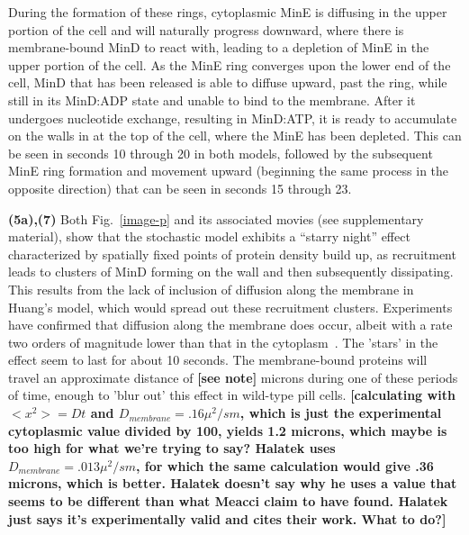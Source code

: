 \documentclass[10pt,letterpaper]{article}
\newcommand{\fixme}[1]{\red{[#1]}}
\newcommand{\red}[1]{{\bf \color{red} #1}}
\newcommand{\blue}[1]{{\bf \color{blue} #1}}
\begin{document}
During the formation of these rings, cytoplasmic MinE is diffusing in
the upper portion of the cell and will naturally progress downward,
where there is membrane-bound MinD to react with, leading to a
depletion of MinE in the upper portion of the cell.  As the MinE ring
converges upon the lower end of the cell, MinD that has been released
is able to diffuse upward, past the ring, while still in its MinD:ADP
state and unable to bind to the membrane.  After it undergoes
nucleotide exchange, resulting in MinD:ATP, it is ready to accumulate
on the walls in at the top of the cell, where the MinE has been
depleted.  This can be seen in seconds 10 through 20 in both models,
followed by the subsequent MinE ring formation and movement upward
(beginning the same process in the opposite direction) that can be
seen in seconds 15 through 23.

\blue{(5a),(7)} Both Fig.~\ref{image-p} and its associated movies (see
supplementary material), show that the stochastic model exhibits a
``starry night'' effect characterized by spatially fixed points of
protein density build up, as recruitment leads to clusters of MinD
forming on the wall and then subsequently dissipating.  This results
from the lack of inclusion of diffusion along the membrane in Huang's
model, which would spread out these recruitment clusters.  Experiments
have confirmed that diffusion along the membrane does occur, albeit
with a rate two orders of magnitude lower than that in the
cytoplasm~\cite{meacci2005min}.  The 'stars' in the effect seem to
last for about 10 seconds. The membrane-bound proteins will travel an
approximate distance of \fixme{see note} microns during one of these
periods of time, enough to 'blur out' this effect in wild-type pill
cells.  \fixme{calculating with $<x^2> = Dt$ and $D_{membrane} =
  .16\mu^2/s m$, which is just the experimental cytoplasmic value
  divided by 100, yields 1.2 microns, which maybe is too high for what
  we're trying to say?  Halatek uses $D_{membrane} = .013\mu^2/s m$,
  for which the same calculation would give .36 microns, which is
  better.  Halatek doesn't say why he uses a value that seems to be
  different than what Meacci claim to have found.  Halatek just says
  it's experimentally valid and cites their work.  What to do?}
\end{document}
